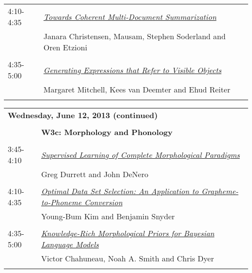 \begin{tabular}{p{20mm}p{138mm}}
4:10-4:35 & \hyperlink{page.1163}{\em Towards Coherent Multi-Document Summarization}\\
         & Janara Christensen, Mausam, Stephen Soderland and Oren Etzioni \\
\\

4:35-5:00 & \hyperlink{page.1174}{\em Generating Expressions that Refer to Visible Objects}\\
         & Margaret Mitchell, Kees van Deemter and Ehud Reiter \\
\\

\end{tabular}
\newpage
\begin{tabular}{p{20mm}p{138mm}}
\\
\multicolumn{2}{l}{\bf Wednesday, June 12, 2013
 (continued)} \\\\
 & {\bf W3c: Morphology and Phonology
} \\
\\
3:45-4:10 & \hyperlink{page.1185}{\em Supervised Learning of Complete Morphological Paradigms}\\
         & Greg Durrett and John DeNero \\
\\

4:10-4:35 & \hyperlink{page.1196}{\em Optimal Data Set Selection: An Application to Grapheme-to-Phoneme Conversion}\\
         & Young-Bum Kim and Benjamin Snyder \\
\\

4:35-5:00 & \hyperlink{page.1206}{\em Knowledge-Rich Morphological Priors for Bayesian Language Models}\\
         & Victor Chahuneau, Noah A. Smith and Chris Dyer \\
\\



\end{tabular}
